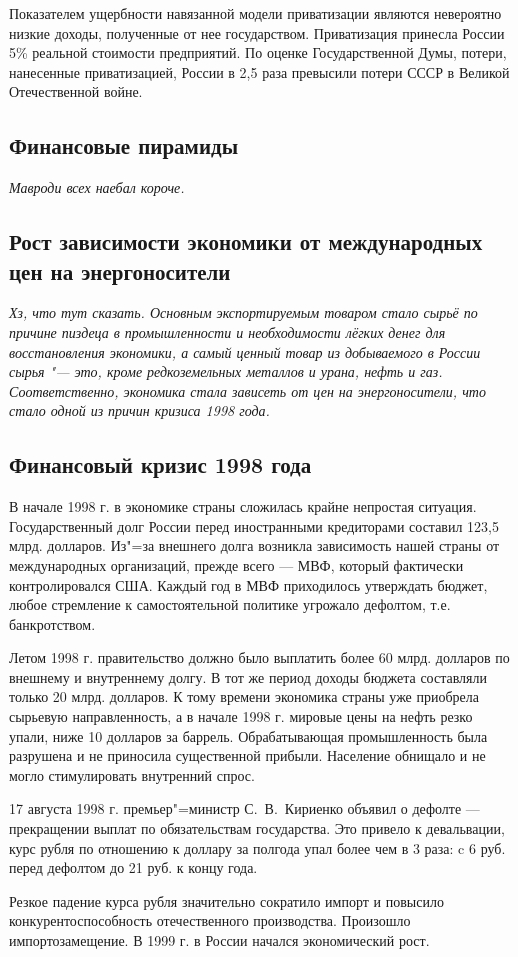 Показателем ущербности навязанной модели приватизации являются невероятно низкие доходы, полученные от нее государством. Приватизация принесла России 5\% реальной стоимости предприятий. По оценке Государственной Думы, потери, нанесенные приватизацией, России в 2,5 раза превысили потери СССР в Великой Отечественной войне.


\subsection{Финансовые пирамиды}
{\it Мавроди всех наебал короче.}

\subsection{Рост зависимости экономики от международных цен на энергоносители}
{\it Хз, что тут сказать. Основным экспортируемым товаром стало сырьё по причине пиздеца в промышленности и необходимости лёгких денег для восстановления экономики, а самый ценный товар из добываемого в России сырья "--- это, кроме редкоземельных металлов и урана, нефть и газ. Соответственно, экономика стала зависеть от цен на энергоносители, что стало одной из причин кризиса 1998 года.}

\subsection{Финансовый кризис 1998 года}
В начале 1998 г. в экономике страны сложилась крайне непростая ситуация. Государственный долг России перед иностранными кредиторами составил 123,5 млрд. долларов. Из"=за внешнего долга возникла зависимость нашей страны от международных организаций, прежде всего --- МВФ, который фактически контролировался США. Каждый год в МВФ приходилось утверждать бюджет, любое стремление к самостоятельной политике угрожало дефолтом, т.е. банкротством.

Летом 1998 г. правительство должно было выплатить более 60 млрд. долларов по внешнему и внутреннему долгу. В тот же период доходы бюджета составляли только 20 млрд. долларов. К тому времени экономика страны уже приобрела сырьевую направленность, а в начале 1998 г. мировые цены на нефть резко упали, ниже 10 долларов за баррель. Обрабатывающая промышленность была разрушена и не приносила существенной прибыли. Население обнищало и не могло стимулировать внутренний спрос.

17 августа 1998 г. премьер"=министр С.~В.~Кириенко объявил о дефолте --- прекращении выплат по обязательствам государства. Это привело к девальвации, курс рубля по отношению к доллару за полгода упал более чем в 3 раза: c 6 руб. перед дефолтом до 21 руб. к концу года.

Резкое падение курса рубля значительно сократило импорт и повысило конкурентоспособность отечественного производства. Произошло импортозамещение. В 1999 г. в России начался экономический рост.
